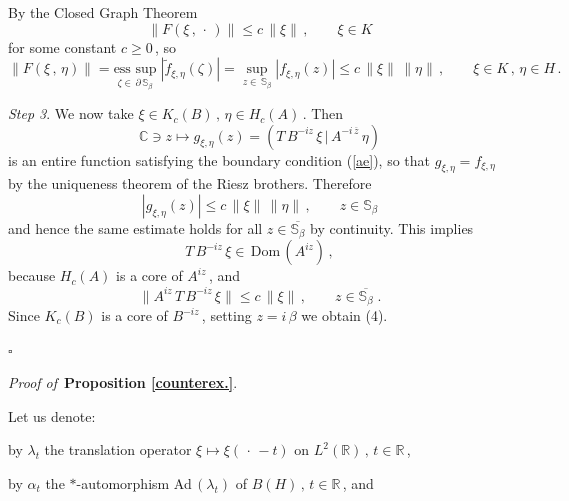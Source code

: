 \documentclass[reqno]{amsart}
\theoremstyle{definition}
\theoremstyle{remark}
\numberwithin{equation}{section}
\theoremstyle{plain}
\begin{document}
By the Closed Graph Theorem
\begin{equation*}
\| F(\xi\, ,\,\cdot\, )\|\leq c\,\|\xi\|\, ,\qquad \xi\in K
\end{equation*}
for some constant $c\geq 0\,$, so
\begin{equation*}
\| F(\xi\, ,\,\eta )\| =
\underset {\zeta\in\,\partial\,\mathbb S_\beta}{\text{ess sup}}\;
|\widetilde f_{\xi ,\eta}(\zeta )| =\sup_{z\in\, \mathbb S_\beta}
|f_{\xi ,\eta}(z)|\leq c\,\|\xi\|\,\|\eta\|\, ,\qquad \xi\in K\, ,\,
\eta\in H\, .
\end{equation*}
\smallskip

{\it Step 3}. We now take $\xi\in K_c(B)\, ,\,\eta\in H_c(A)\,$.
Then
\begin{equation*}
\mathbb C\ni z\longmapsto g_{\xi ,\eta}(z)=(T\, B^{-iz}\,\xi\, |\,
A^{-i\,\overline z}\,\eta )
\end{equation*}
is an entire function satisfying the boundary condition (\ref{ae}),
so that $g_{\xi ,\eta}=f_{\xi ,\eta}$ by the  uniqueness theorem of
the Riesz brothers. Therefore
\begin{equation*}
|g_{\xi ,\eta}(z)|\leq c\,\|\xi\|\,\|\eta\|\, ,\qquad
z\in\mathbb S_\beta
\end{equation*}
and hence the same estimate holds for all $z\in
\overline {\mathbb S_\beta}$ by continuity. This implies
\begin{equation*}
T\, B^{-iz}\,\xi\in\,\text{Dom}\, (A^{iz})\, ,
\end{equation*}
because $H_c(A)$ is a core of $A^{iz}\,$, and
\begin{equation*}
\| A^{iz}\, T\, B^{-iz}\,\xi\|\leq c\,\|\xi\|\, ,\qquad z\in
\overline {\mathbb S_\beta}\; .
\end{equation*}
Since $K_c(B)$ is a core of $B^{-iz}\,$, setting $z=i\,\beta$
we obtain (4).

\hfill $\square\quad$

\medskip

{\it Proof of }$\,${\bf Proposition \ref{counterex.}}.
\medskip

Let us denote:
\smallskip

\noindent\hspace{1.05 cm} by $\lambda_t$ the translation operator
$\xi\longmapsto\xi (\,\cdot\, -t)$ on $L^2(\mathbb R )\, ,\, t\in
\mathbb R\,$,
\smallskip

\noindent\hspace{1.05 cm} by $\alpha_t$ the $*$-automorphism
Ad$\, (\lambda_t )$ of $B(H)\, ,\, t\in\mathbb R\,$, and
\smallskip
\end{document}
